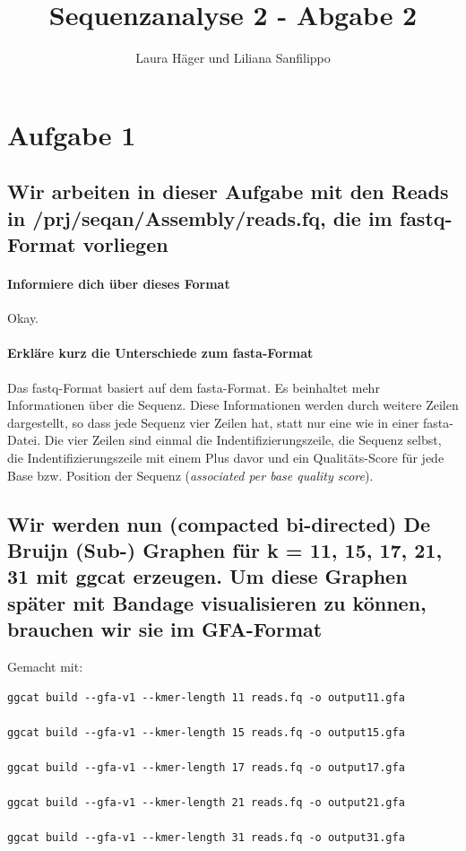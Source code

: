\documentclass[11pt,a4paper]{article}
\title{Sequenzanalyse 2 - Abgabe 2}
\author{Laura Häger und Liliana Sanfilippo}
\begin{document}
    \maketitle

    \section{Aufgabe 1}
    \subsection{Wir arbeiten in dieser Aufgabe mit den Reads in /prj/seqan/Assembly/reads.fq, die im fastq-
    Format vorliegen}
    \paragraph{Informiere dich über dieses Format}
    Okay.
    \paragraph{Erkläre kurz die Unterschiede zum fasta-Format} Das fastq-Format basiert auf dem fasta-Format. Es beinhaltet mehr Informationen über die Sequenz. Diese Informationen werden durch weitere Zeilen dargestellt, so dass jede Sequenz vier Zeilen hat, statt nur eine wie in einer fasta-Datei. Die vier Zeilen sind einmal die Indentifizierungszeile, die Sequenz selbst, die Indentifizierungszeile mit einem Plus davor und ein Qualitäts-Score für jede Base bzw. Position der Sequenz (\textit{associated per base quality score}). \cite{Cock2010, compgenomr}

    \subsection{Wir werden nun (compacted bi-directed) De Bruijn (Sub-) Graphen für k = 11, 15, 17, 21, 31 mit
    ggcat erzeugen. Um diese Graphen später mit Bandage visualisieren zu können, brauchen wir sie im GFA-Format}
    Gemacht mit:
    \begin{verbatim}
ggcat build --gfa-v1 --kmer-length 11 reads.fq -o output11.gfa

ggcat build --gfa-v1 --kmer-length 15 reads.fq -o output15.gfa

ggcat build --gfa-v1 --kmer-length 17 reads.fq -o output17.gfa

ggcat build --gfa-v1 --kmer-length 21 reads.fq -o output21.gfa

ggcat build --gfa-v1 --kmer-length 31 reads.fq -o output31.gfa
    \end{verbatim}
\end{document}
